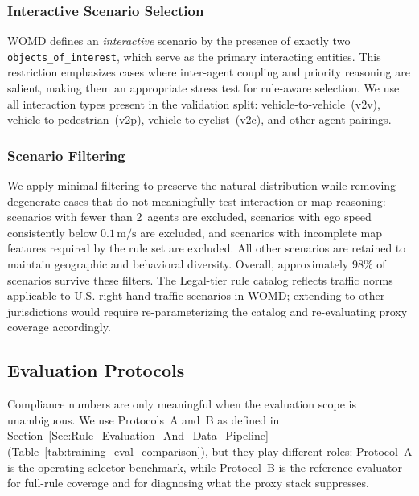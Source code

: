 \subsubsection{Interactive Scenario Selection}

WOMD defines an \emph{interactive} scenario by the presence of exactly two \texttt{objects\_of\_interest}, which serve as the primary interacting entities. This restriction emphasizes cases where inter-agent coupling and priority reasoning are salient, making them an appropriate stress test for rule-aware selection. We use all interaction types present in the validation split: vehicle-to-vehicle~(v2v), vehicle-to-pedestrian~(v2p), vehicle-to-cyclist~(v2c), and other agent pairings.

\subsubsection{Scenario Filtering}

We apply minimal filtering to preserve the natural distribution while removing degenerate cases that do not meaningfully test interaction or map reasoning: scenarios with fewer than 2~agents are excluded, scenarios with ego speed consistently below $0.1\,\text{m/s}$ are excluded, and scenarios with incomplete map features required by the rule set are excluded. All other scenarios are retained to maintain geographic and behavioral diversity. Overall, approximately 98\% of scenarios survive these filters. The Legal-tier rule catalog reflects traffic norms applicable to U.S. right-hand traffic scenarios in WOMD; extending to other jurisdictions would require re-parameterizing the catalog and re-evaluating proxy coverage accordingly.

\subsection{Evaluation Protocols}
\label{subsec:eval_protocols}

Compliance numbers are only meaningful when the evaluation scope is unambiguous. We use Protocols~A and~B as defined in Section~\ref{Sec:Rule_Evaluation_And_Data_Pipeline} (Table~\ref{tab:training_eval_comparison}), but they play different roles: Protocol~A is the operating selector benchmark, while Protocol~B is the reference evaluator for full-rule coverage and for diagnosing what the proxy stack suppresses.

